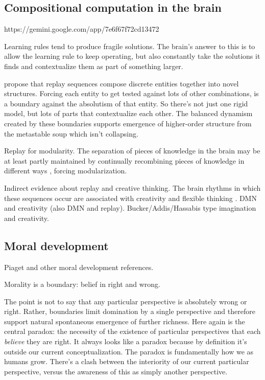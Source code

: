 \subsection{Compositional computation in the brain}

https://gemini.google.com/app/7e6f67f72cd13472

Learning rules tend to produce fragile solutions. The brain's answer to this is to allow the learning rule to keep operating, but also constantly take the solutions it finds and contextualize them as part of something larger. 

\cite{kurth2023replay} propose that replay sequences compose discrete entities together into novel structures. Forcing each entity to get tested against lots of other combinations, is a boundary against the absolutism of that entity. So there's not just one rigid model, but lots of parts that contextualize each other. The balanced dynamism created by these boundaries supports emergence of higher-order structure from the metastable soup which isn't collapsing. 

Replay for modularity. The separation of pieces of knowledge in the brain may be at least partly maintained by continually recombining pieces of knowledge in different ways \citep{kurth2023replay}, forcing modularization. 

Indirect evidence about replay and creative thinking. The brain rhythms in which these sequences occur are associated with creativity and flexible thinking \citep{beaty2014creativity}. DMN and creativity (also DMN and replay). Bucker/Addis/Hassabis type imagination and creativity.




\subsection{Moral development}

Piaget and other moral development references.

Morality is a boundary: belief in right and wrong. 

The point is not to say that any particular perspective is absolutely wrong or right. Rather, boundaries limit domination by a single perspective and therefore support natural spontaneous emergence of further richness. Here again is the central paradox: the necessity of the existence of particular perspectives that each \textit{believe} they are right. It always looks like a paradox because by definition it's outside our current conceptualization. The paradox is fundamentally how we as humans grow. There's a clash between the interiority of our current particular perspective, versus the awareness of this as simply another perspective.

